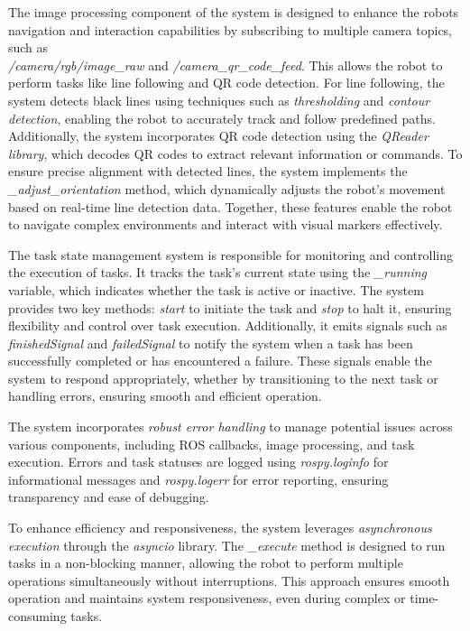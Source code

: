 \documentclass[a4paper,12pt]{extreport}
\begin{document}
\newpage
The image processing component of the system is designed to enhance the
robot\textquotesingle s navigation and interaction capabilities by
subscribing to multiple camera topics, such as\\
\emph{/camera/rgb/image\_raw} and \emph{/camera\_qr\_code\_feed}. This
allows the robot to perform tasks like line following and QR code
detection. For line following, the system detects black lines using
techniques such as \emph{thresholding} and \emph{contour detection},
enabling the robot to accurately track and follow predefined paths.
Additionally, the system incorporates QR code detection using the
\emph{QReader library}, which decodes QR codes to extract relevant
information or commands. To ensure precise alignment with detected
lines, the system implements the \emph{\_adjust\_orientation} method,
which dynamically adjusts the robot's movement based on real-time line
detection data. Together, these features enable the robot to navigate
complex environments and interact with visual markers effectively.

The task state management system is responsible for monitoring and
controlling the execution of tasks. It tracks the task's current state
using the \emph{\_running} variable, which indicates whether the task is
active or inactive. The system provides two key methods: \emph{start} to
initiate the task and \emph{stop} to halt it, ensuring flexibility and
control over task execution. Additionally, it emits signals such as
\emph{finishedSignal} and \emph{failedSignal} to notify the system when
a task has been successfully completed or has encountered a failure.
These signals enable the system to respond appropriately, whether by
transitioning to the next task or handling errors, ensuring smooth and
efficient operation.

The system incorporates \emph{robust error handling} to manage potential
issues across various components, including ROS callbacks, image
processing, and task execution. Errors and task statuses are logged
using \emph{rospy.loginfo} for informational messages and
\emph{rospy.logerr} for error reporting, ensuring transparency and ease
of debugging.

To enhance efficiency and responsiveness, the system leverages
\emph{asynchronous execution} through the \emph{asyncio} library. The
\emph{\_execute} method is designed to run tasks in a non-blocking
manner, allowing the robot to perform multiple operations simultaneously
without interruptions. This approach ensures smooth operation and
maintains system responsiveness, even during complex or time-consuming
tasks.
\end{document}
